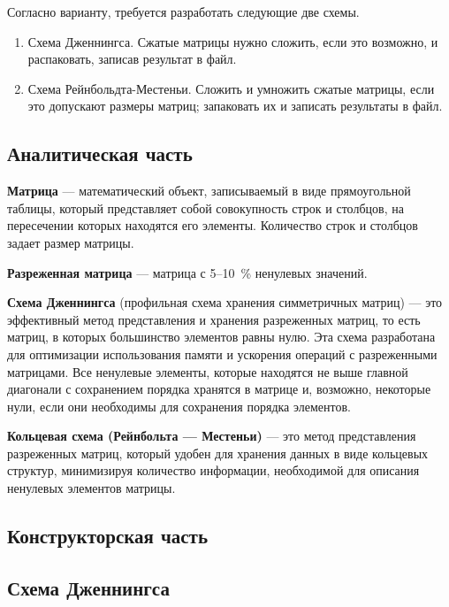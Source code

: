 \documentclass[12pt, a4paper]{article}
\begin{document}
Согласно варианту, требуется разработать следующие две схемы.
\begin{enumerate}
\item Схема Дженнингса. Сжатые матрицы нужно сложить, если это возможно, и распаковать, записав результат в файл.
\item Схема Рейнбольдта-Местеньи. Сложить и умножить сжатые матрицы, если это допускают размеры матриц; запаковать их и записать результаты в файл.
\end{enumerate}


\newpage
\begin{center}
   \section{Аналитическая часть} 
\end{center}

\textbf{Матрица} --- математический объект, записываемый в виде прямоугольной таблицы, который представляет собой совокупность строк и столбцов, на пересечении которых находятся его элементы. Количество строк и столбцов задает размер матрицы.

\textbf{Разреженная матрица} --- матрица с 5--10~\% ненулевых значений.

\textbf{Схема Дженнингса} (профильная схема хранения симметричных матриц) --- это эффективный метод представления и хранения разреженных матриц, то есть матриц, в которых большинство элементов равны нулю. Эта схема разработана для оптимизации использования памяти и ускорения операций с разреженными матрицами. Все ненулевые элементы, которые находятся не выше главной диагонали с сохранением порядка хранятся в матрице и, возможно, некоторые нули, если они необходимы для сохранения порядка элементов.

\textbf{Кольцевая схема (Рейнбольта --- Местеньи)} --- это метод представления разреженных матриц, который удобен для хранения данных в виде кольцевых структур, минимизируя количество информации, необходимой для описания ненулевых элементов матрицы.

\newpage
\begin{center}
    \section{Конструкторская часть}
\end{center}
\subsection{Схема Дженнингса}
\end{document}
